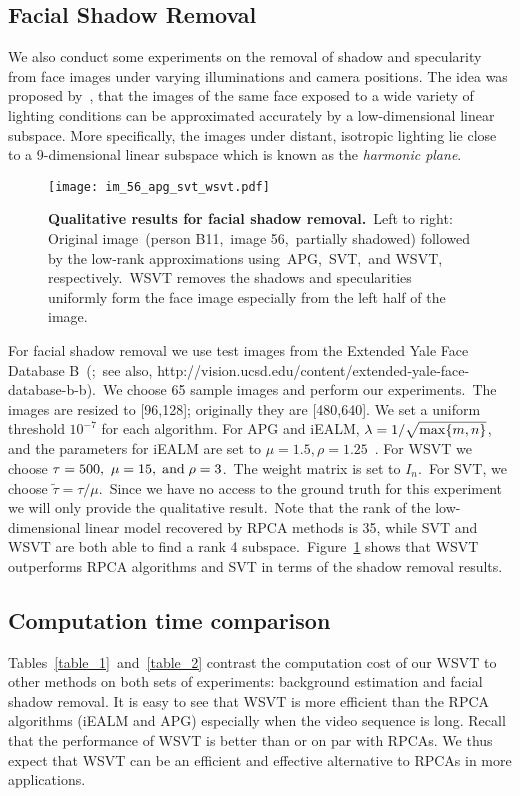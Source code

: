 \documentclass[twoside,11pt]{article}
\begin{document}
\subsection{Facial Shadow Removal}

We also conduct some experiments on the removal of shadow and specularity from face images under varying illuminations and camera positions. The idea was proposed by~\citet{basri}, that the images of the same face exposed to a wide variety of lighting conditions can be approximated accurately by a low-dimensional linear subspace. More specifically, the images under distant, isotropic lighting lie close to a 9-dimensional linear subspace which is known as the {\it harmonic plane}. 	
\begin{figure}[H]
 \texttt{[image: im\_56\_apg\_svt\_wsvt.pdf]}
	\caption{{\bf Qualitative results for facial shadow removal.}~Left to right: Original image~(person B11,~image 56,~partially shadowed) followed by the low-rank approximations using~APG,~SVT,~and WSVT, respectively.~WSVT removes the shadows and specularities uniformly form the face image especially from the left half of the image.}\label{face}
\end{figure}

For facial shadow removal we use test images from the Extended Yale Face Database B~(\citep{yale};~see also, http://vision.ucsd.edu/content/extended-yale-face-database-b-b).~We choose 65 sample images and perform our experiments.~The images are resized to [96,128]; originally they are [480,640]. We set a uniform threshold $10^{-7}$ for each algorithm. For APG and iEALM, $\lambda={1}/{\sqrt{{\rm max}\{m,n\}}}$, and the parameters for iEALM are set to $\mu=1.5, \rho=1.25$~\citep{APG,LinChenMa}. For WSVT we choose $\tau=500,~\mu = 15,\;{\rm and}\;\rho=3$.~The weight matrix is set to $I_n$.~For SVT, we choose $\tilde{\tau}=\tau/\mu$.~Since we have no access to the ground truth for this experiment we will only provide the qualitative result.~Note that the rank of the low-dimensional linear model recovered by RPCA methods is 35, while SVT and WSVT are both able to find a rank 4 subspace.~Figure~\ref{face} shows that WSVT outperforms RPCA algorithms and SVT in terms of the shadow removal results. 


\subsection{Computation time comparison}
Tables~\ref{table_1}~and~\ref{table_2} contrast the computation cost of our WSVT to other methods on both sets of experiments: background estimation and facial shadow removal. It is easy to see that WSVT is more efficient than the RPCA algorithms (iEALM and APG) especially when the video sequence is long. Recall that the performance of WSVT is better than or on par with RPCAs. We thus expect that WSVT can be an efficient and effective alternative to RPCAs in more applications.
\end{document}
